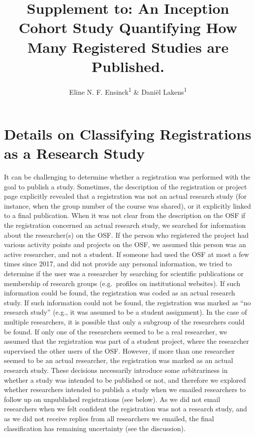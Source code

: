 \documentclass[
  ,jou, a4paper,floatsintext]{apa6}
\title{Supplement to: An Inception Cohort Study Quantifying How Many Registered Studies are Published.}
\author{Eline N. F. Ensinck\textsuperscript{1} \& Daniël Lakens\textsuperscript{1}}
\date{}
\affiliation{\vspace{0.5cm}\textsuperscript{1} Eindhoven University of Technology}
\begin{document}
\maketitle

\hypertarget{details-on-classifying-registrations-as-a-research-study}{%
\section{Details on Classifying Registrations as a Research Study}\label{details-on-classifying-registrations-as-a-research-study}}

It can be challenging to determine whether a registration was performed with the goal to publish a study. Sometimes, the description of the registration or project page explicitly revealed that a registration was not an actual research study (for instance, when the group number of the course was shared), or it explicitly linked to a final publication. When it was not clear from the description on the OSF if the registration concerned an actual research study, we searched for information about the researcher(s) on the OSF. If the person who registered the project had various activity points and projects on the OSF, we assumed this person was an active researcher, and not a student. If someone had used the OSF at most a few times since 2017, and did not provide any personal information, we tried to determine if the user was a researcher by searching for scientific publications or membership of research groups (e.g.~profiles on institutional websites). If such information could be found, the registration was coded as an actual research study. If such information could not be found, the registration was marked as ``no research study'' (e.g., it was assumed to be a student assignment). In the case of multiple researchers, it is possible that only a subgroup of the researchers could be found. If only one of the researchers seemed to be a real researcher, we assumed that the registration was part of a student project, where the researcher supervised the other users of the OSF. However, if more than one researcher seemed to be an actual researcher, the registration was marked as an actual research study. These decisions necessarily introduce some arbitrariness in whether a study was intended to be published or not, and therefore we explored whether researchers intended to publish a study when we emailed researchers to follow up on unpublished registrations (see below). As we did not email researchers when we felt confident the registration was not a research study, and as we did not receive replies from all researchers we emailed, the final classification has remaining uncertainty (see the discussion).
\end{document}
